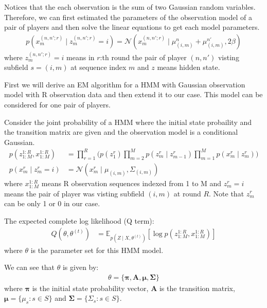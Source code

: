 \documentclass[12pt]{article}
\newenvironment{problem}[2][Problem]{\begin{trivlist}
\item[\hskip \labelsep {\bfseries #1}\hskip \labelsep {\bfseries #2.}]}{\end{trivlist}}
\begin{document}
\begin{problem}{2.6.18}
Notices that the each observation is the sum of two Gaussian random variables.
Therefore, we can first estimated the parameters of the observation model of 
a pair of players and then solve the linear equations to get each model parameters.
\begin{align*}
    p(x_m^{(n,n';r)}\mid z_m^{(n,n';r)} = i) = \mathcal{N}(x_m^{(n,n';r)} 
            \mid \mu^{n}_{(i,m)} + \mu^{n'}_{(i,m)}, 2\beta)
\end{align*}
where $z_m^{(n,n';r)} = i$ means in $r$:th round the pair of player $(n, n')$ visting 
subfield $s = (i, m)$ at sequence index $m$ and $z$ means hidden state.

First we will derive an EM algorithm for a HMM with Gaussian observation model 
with R observation data and then extend it to our case. This model can be considered
for one pair of players.

Consider the joint probability of a HMM where the initial state probaility and 
the transition matrix are given and the observation model is a conditional
Gaussian.
\begin{align*}
    p(z^{1:R}_{1:M}, x^{1:R}_{1:M}) &= \prod_{r=1}^{R} \biggl(
            p(z^r_1) \prod_{m=2}^{M}p(z^r_m\mid z^r_{m-1})
            \prod_{m=1}^{M}p(x^r_m\mid z^r_m) \biggl)\\
    p(x^r_m\mid z^r_m= i) &= \mathcal{N}(x^r_m \mid \mu_{(i,m)}, \Sigma_{(i,m)})
\end{align*}
where $x^{1:R}_{1:M}$ means R observation sequences indexed from 1 to M and
$z^r_m= i$ means the pair of player was visting subfield $(i, m)$ at round $R$.
Note that $z^r_m$ can be only 1 or 0 in our case.

The expected complete log likelihood (Q term):
\begin{align*}
    Q(\theta, \theta^{(t)}) &= \mathbb{E}_{p(Z\mid X, \theta^{(t)})}[
        \log p(z^{1:R}_{1:M}, x^{1:R}_{1:M})]
\end{align*}
where $\theta$ is the parameter set for this HMM model.

We can see that $\theta$ is given by:
\begin{align*}
    \theta = \{\bm{\pi}, \bm{A}, \bm{\mu}, \bm{\Sigma}\}
\end{align*}
where $\bm{\pi}$ is the initial state probability vector, $\bm{A}$ is the transition
matrix, $\bm{\mu} = \{ \mu_s: s \in S\}$ and $\bm{\Sigma} = \{ \Sigma_s: s \in S\}$.


\end{problem}
\end{document}
